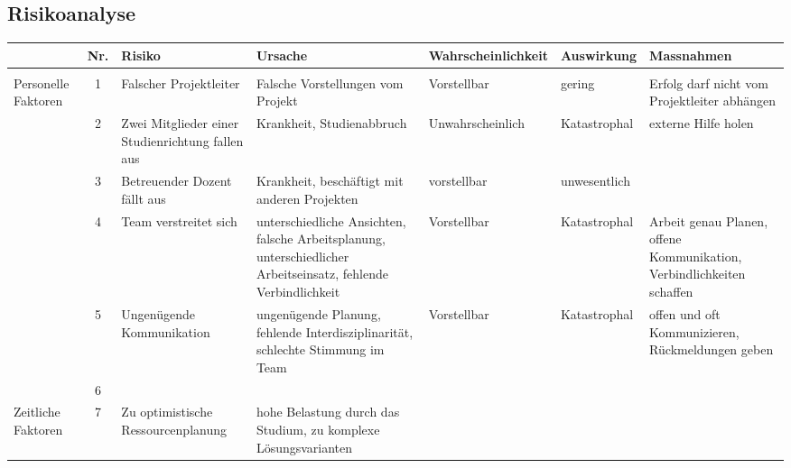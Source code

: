 \begin{landscape}
\subsection{Risikoanalyse}
\begin{table}[h!]
    \small
    \centering
    \begin{tabular}{p{} c p{} p{} p{} p{} p{}}
		& Nr. & Risiko & Ursache & Wahrscheinlichkeit & Auswirkung & Massnahmen \\
        \hline \hline
        & & & & & & \\
        \rowcolor{yellow} Personelle Faktoren 
            & 1 
            & Falscher Projektleiter 
            & Falsche Vorstellungen vom Projekt 
            & Vorstellbar 
            & gering 
            & Erfolg darf nicht vom Projektleiter abhängen \\ 
        \rowcolor{yellow}
	        & 2 
            & Zwei Mitglieder einer Studienrichtung fallen aus 
            & Krankheit, Studienabbruch 
            & Unwahrscheinlich 
            & Katastrophal 
            & externe Hilfe holen \\
        \rowcolor{green}
            & 3 
            & Betreuender Dozent fällt aus 
            & Krankheit, beschäftigt mit anderen Projekten 
            & vorstellbar 
            & unwesentlich 
            & \\
        \rowcolor{yellow}
            & 4	
            & Team verstreitet sich	
            & unterschiedliche Ansichten, falsche Arbeitsplanung, unterschiedlicher Arbeitseinsatz, fehlende Verbindlichkeit	
            & Vorstellbar 
            & Katastrophal 
            & Arbeit genau Planen, offene Kommunikation, Verbindlichkeiten schaffen \\
        \rowcolor{yellow}
            & 5	
            & Ungenügende Kommunikation 
            & ungenügende Planung, fehlende Interdisziplinarität, schlechte Stimmung im Team 
            & Vorstellbar 
            & Katastrophal 
            & offen und oft Kommunizieren, Rückmeldungen geben \\
        \rowcolor{yellow}
            & 6	
            & 
            & 
            & 
            & 
            & \\
        \rowcolor{yellow} Zeitliche Faktoren 
            & 7 
            & Zu optimistische Ressourcenplanung 
            & hohe Belastung durch das Studium, zu komplexe Lösungsvarianten 

\end{tabular}
\end{table}
\end{landscape}
